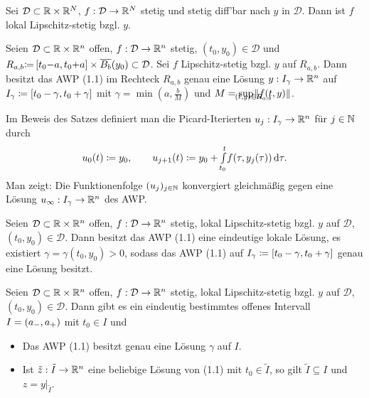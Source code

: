 \documentclass{cheat-sheet}
\newcommand{\D}{\mathcal{D}}
\begin{document}
\begin{lem}
  Sei $\D \subset \R \times \R^N$, $f : \D \to \R^N$ stetig und stetig diff'bar nach $y$ in $\D$. Dann ist $f$ lokal Lipschitz-stetig bzgl. $y$.
\end{lem}


\begin{satz}
  Seien $\D \subset \R \times \R^n$ offen, $f : \D \to \R^n$ stetig, $(t_0, y_0) {\in} \D$ und $R_{a,b} {\coloneqq} \cinterval{ t_0 {-} a }{ t_0 {+} a } \times \overline{B_b}(y_0) \subset \D$. Sei $f$ Lipschitz-stetig bzgl. $y$ auf $R_{a,b}$. Dann besitzt das AWP (1.1) im Rechteck $R_{a,b}$ genau eine Lösung $y : I_{\gamma} \to \mathbb{R}^n$ auf $I_{\gamma} \coloneqq \left[ t_0 - \gamma, t_0 + \gamma \right]$ mit $\gamma = \min(a, \tfrac{b}{M})$ und $M = \sup_{\mathclap{(t,y) \in R_{a,b}}} \norm{f(t, y)}$.
\end{satz}

\begin{bem}
  Im Beweis des Satzes definiert man die Picard-Iterierten $u_j : I_\gamma \to \mathbb{R}^n$ für $j \in \mathbb{N}$ durch
  \[
    u_0(t) \coloneqq y_0, \qquad
    u_{j+1}(t) \coloneqq y_0 + {\textstyle \int\limits_{t_0}^{t}} f(\tau, y_j(\tau)) \,\mathrm{d} \tau.
  \]
  Man zeigt: Die Funktionenfolge $(u_j)_{j \in \mathbb{N}}$ konvergiert gleichmäßig gegen eine Lösung $u_\infty : I_\gamma \to \mathbb{R}^n$ des AWP.
\end{bem}


\begin{satz}
  Seien $\D \subset \R \times \R^n$ offen, $f : \D \to \R^n$ stetig, lokal Lipschitz-stetig bzgl. $y$ auf $\D$, $(t_0, y_0) \in \D$. Dann besitzt das AWP (1.1) eine eindeutige lokale Lösung, \dh{} es existiert $\gamma = \gamma(t_0, y_0) > 0$, sodass das AWP (1.1) auf $I_\gamma \coloneqq \left[ t_0 - \gamma, t_0 + \gamma \right]$ genau eine Lösung besitzt.
\end{satz}

\begin{satz}
  Seien $\D \subset \R \times \R^n$ offen, $f : \D \to \R^n$ stetig, lokal Lipschitz-stetig bzgl. $y$ auf $\D$, $(t_0, y_0) \in \D$. Dann gibt es ein eindeutig bestimmtes offenes Intervall $I = \left( a_-, a_+ \right)$ mit $t_0 {\in} I$ und
  \begin{itemize}
    \item Das AWP (1.1) besitzt genau eine Lösung $\gamma$ auf $I$.
    \item Ist $\tilde{z} : \tilde{I} \to \mathbb{R}^n$ eine beliebige Lösung von (1.1) mit $t_0 \in \tilde{I}$, so gilt $\tilde{I} \subseteq I$ und $z = y|_{\tilde{I}}$.
  \end{itemize}
\end{satz}
\end{document}
